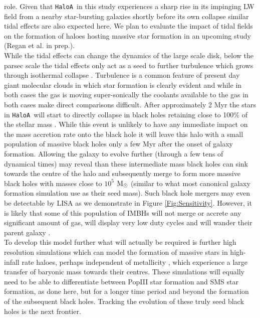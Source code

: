 \documentclass[twocolumn,iop,revtex4]{openjournal}
\newcommand{\msolar} {$\rm{M_{\odot}}~$}
\newcommand{\ha} {\texttt{HaloA~}}
\begin{document}
role. Given that \ha in this study experiences a sharp rise in its impinging LW field from a
nearby star-bursting galaxies shortly before its own collapse similar tidal effects are also expected
here. We plan to evaluate the impact of tidal fields on the formation of haloes hosting massive
star formation in an upcoming study (Regan et al. in prep.). \\
\indent While the tidal effects can change the dynamics of the large scale disk, below the parsec
scale the tidal effects only act as a seed to further turbulence which grows through isothermal
collapse \citep{Chon_2017b}.
Turbulence is a common feature of present day giant molecular clouds in
which star formation is clearly evident \citep[e.g.][]{Girichidis_2020, Lee_2020, Krause_2020}
and while in both cases the gas is moving super-sonically the coolants available to the gas in both
cases make direct comparisons difficult. 
After approximately 2 Myr the stars in \ha will start to directly
collapse in black holes retaining close to 100\% of the stellar mass \citep{Heger_2003}. While this
event is unlikely to have any immediate impact on the mass accretion rate onto the black hole it will
leave this halo with a small population of massive black holes only a few Myr after the onset of galaxy formation. Allowing the galaxy to evolve further  (through a few tens of dynamical times) may
reveal than these intermediate mass black holes can sink towards the centre of the halo and subsequently merge to form more massive black holes with masses close to $10^5$ \msolar (similar to what most canonical galaxy formation
simulation use as their seed mass). Such black hole mergers may even be
detectable by LISA as we demonstrate in Figure \ref{Fig:Sensitivity}. However, it is likely that some of this population of IMBHs will not merge or accrete any significant amount of gas, will display very low duty cycles and will wander their parent galaxy \citep{Tremmel_2018, Reines_2020, Barausse_2020}.\\
\indent To develop this model further what will actually be required is further high
resolution simulations which can model the formation of massive stars in high-infall rate haloes,
perhaps independent of metallicity \citep{Chon_2020, Regan_2020a}, which experience
a large transfer of baryonic mass towards their centres. These simulations will equally need to
be able to differentiate between PopIII star formation and SMS star formation, as done here, but
for a longer time period and beyond the formation of the subsequent black holes.
Tracking the evolution of these truly seed black holes is the next frontier. 
\end{document}

